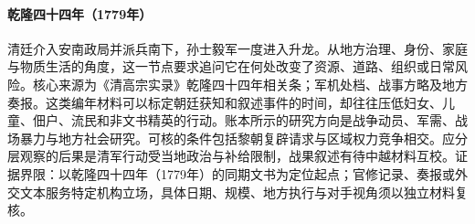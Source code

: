 \hypertarget{social:EQ-1779-VIETNAM-INTERVENTION}{}\paragraph{乾隆四十四年（1779年）}清廷介入安南政局并派兵南下，孙士毅军一度进入升龙。从地方治理、身份、家庭与物质生活的角度，这一节点要求追问它在何处改变了资源、道路、组织或日常风险。核心来源为《清高宗实录》乾隆四十四年相关条；军机处档、战事方略及地方奏报。这类编年材料可以标定朝廷获知和叙述事件的时间，却往往压低妇女、儿童、佃户、流民和非文书精英的行动。账本所示的研究方向是战争动员、军需、战场暴力与地方社会研究。可核的条件包括黎朝复辟请求与区域权力竞争相交。应分层观察的后果是清军行动受当地政治与补给限制，战果叙述有待中越材料互校。证据界限：以乾隆四十四年（1779年）的同期文书为定位起点；官修记录、奏报或外交文本服务特定机构立场，具体日期、规模、地方执行与对手视角须以独立材料复核。
